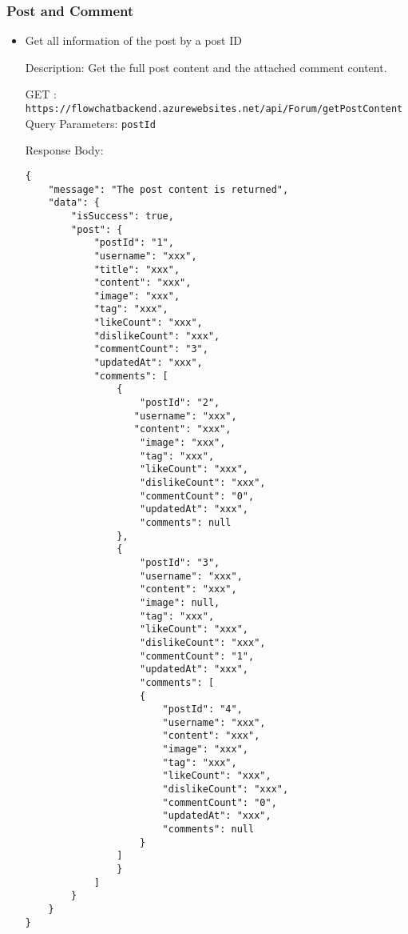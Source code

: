 \documentclass[11pt, a4paper]{article}
\begin{document}
\subsubsection{Post and Comment}
\begin{itemize}

\item Get all information of the post by a post ID

Description: Get the full post content and the attached comment content. 

GET :  \texttt{https://flowchatbackend.azurewebsites.net/api/Forum/getPostContent}\\
Query Parameters: \verb|postId|
    
Response Body:
    \begin{lstlisting}[breaklines=true, frame=single]
{
    "message": "The post content is returned",
    "data": {
        "isSuccess": true,
        "post": {
            "postId": "1",
            "username": "xxx",
            "title": "xxx",
            "content": "xxx",
            "image": "xxx",
            "tag": "xxx",
            "likeCount": "xxx",
            "dislikeCount": "xxx",
            "commentCount": "3",
            "updatedAt": "xxx",
            "comments": [
                {
                    "postId": "2",
                   "username": "xxx",
                   "content": "xxx",
                    "image": "xxx",
                    "tag": "xxx",
                    "likeCount": "xxx",
                    "dislikeCount": "xxx",
                    "commentCount": "0",
                    "updatedAt": "xxx",
                    "comments": null
                },
                {
                    "postId": "3",
                    "username": "xxx",
                    "content": "xxx",
                    "image": null,
                    "tag": "xxx",
                    "likeCount": "xxx",
                    "dislikeCount": "xxx",
                    "commentCount": "1",
                    "updatedAt": "xxx",
                    "comments": [
                    {
                        "postId": "4",
                        "username": "xxx",
                        "content": "xxx",
                        "image": "xxx",
                        "tag": "xxx",
                        "likeCount": "xxx",
                        "dislikeCount": "xxx",
                        "commentCount": "0",
                        "updatedAt": "xxx",
                        "comments": null
                    }
                ]
                }
            ]
        }
    }
}
    \end{lstlisting}


\end{itemize}
\end{document}
